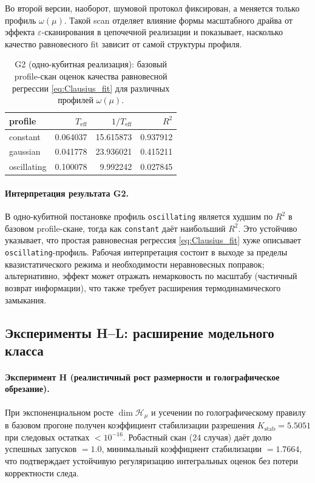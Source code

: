 \documentclass[11pt,a4paper]{article}
\theoremstyle{definition}
\theoremstyle{plain}
\theoremstyle{remark}
\begin{document}
Во второй версии, наоборот, шумовой протокол фиксирован, а меняется только профиль $\omega(\mu)$.
Такой scan отделяет влияние формы масштабного драйва от эффекта $\varepsilon$-сканирования в цепочечной реализации
и показывает, насколько качество равновесного fit зависит от самой структуры профиля.

\begin{table}[t]
\centering
\caption{G2 (одно-кубитная реализация): базовый profile-скан оценок
качества равновесной регрессии \cref{eq:Clausius_fit} для различных профилей $\omega(\mu)$.}
\label{tab:G2profiles}
\begin{tabular}{@{}lrrr@{}}
\toprule
profile & $T_{\mathrm{eff}}$ & $1/T_{\mathrm{eff}}$ & $R^2$ \\
\midrule
constant    & 0.064037 & 15.615873 & 0.937912 \\
gaussian    & 0.041778 & 23.936021 & 0.415211 \\
oscillating & 0.100078 & 9.992242  & 0.027845 \\
\bottomrule
\end{tabular}
\end{table}

\paragraph{Интерпретация результата G2.}
В одно-кубитной постановке профиль \texttt{oscillating} является худшим по $R^2$ в базовом profile-скане,
тогда как \texttt{constant} даёт наибольший $R^2$.
Это устойчиво указывает, что простая равновесная регрессия \eqref{eq:Clausius_fit}
хуже описывает \texttt{oscillating}-профиль.
Рабочая интерпретация состоит в выходе за пределы квазистатического режима
и необходимости неравновесных поправок; альтернативно, эффект может отражать немарковость
по масштабу (частичный возврат информации), что также требует расширения термодинамического замыкания.

\subsection{Эксперименты H--L: расширение модельного класса}
\label{sec:numerics:HIJKL}

\paragraph{Эксперимент H (реалистичный рост размерности и голографическое обрезание).}
При экспоненциальном росте $\dim\mathcal H_\mu$ и усечении по голографическому правилу
в базовом прогоне получен коэффициент стабилизации разрешения
$K_{\mathrm{stab}}=5.5051$
при следовых остатках $<10^{-16}$.
Робастный скан (24 случая) даёт
долю успешных запусков $=1.0$,
минимальный коэффициент стабилизации $=1.7664$,
что подтверждает устойчивую регуляризацию интегральных оценок без потери корректности следа.
\end{document}
